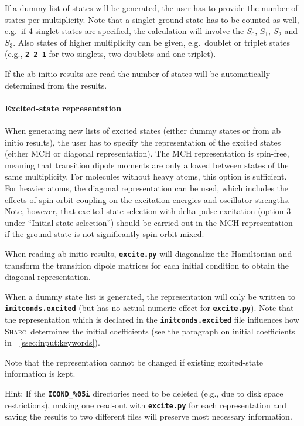 \documentclass[a4paper,10pt,DIV=15,openany]{scrbook}
\newcommand{\sharc}{\textsc{Sharc}}
\newcommand{\ttt}[1]{\textbf{\texttt{#1}}}
\begin{document}
If a dummy list of states will be generated, the user has to provide the number of states per multiplicity. Note that a singlet ground state has to be counted as well, e.g.\ if 4 singlet states are specified, the calculation will involve the $S_0$, $S_1$, $S_2$ and $S_3$. Also states of higher multiplicity can be given, e.g.\ doublet or triplet states (e.g., \ttt{2 2 1} for two singlets, two doublets and one triplet).

If the ab initio results are read the number of states will be automatically determined from the results.

\paragraph{Excited-state representation}

When generating new lists of excited states (either dummy states or from ab initio results), the user has to specify the representation of the excited states (either MCH or diagonal representation). The MCH representation is spin-free, meaning that transition dipole moments are only allowed between states of the same multiplicity. For molecules without heavy atoms, this option is sufficient. For heavier atoms, the diagonal representation can be used, which includes the effects of spin-orbit coupling on the excitation energies and oscillator strengths. 
Note, however, that excited-state selection with delta pulse excitation (option 3 under ``Initial state selection'') should be carried out in the MCH representation if the ground state is not significantly spin-orbit-mixed.

When reading ab initio results, \ttt{excite.py} will diagonalize the Hamiltonian and transform the transition dipole matrices for each initial condition to obtain the diagonal representation. 

When a dummy state list is generated, the representation will only be written to \ttt{initconds.excited} (but has no actual numeric effect for \ttt{excite.py}). Note that the representation which is declared in the \ttt{initconds.excited} file influences how \sharc\ determines the initial coefficients (see the paragraph on initial coefficients in~~\ref{ssec:input:keywords}).

Note that the representation cannot be changed if existing excited-state information is kept. 

Hint: If the \ttt{ICOND\_\%05i} directories need to be deleted (e.g., due to disk space restrictions), making one read-out with \ttt{excite.py} for each representation and saving the results to two different files will preserve most necessary information.
\end{document}
